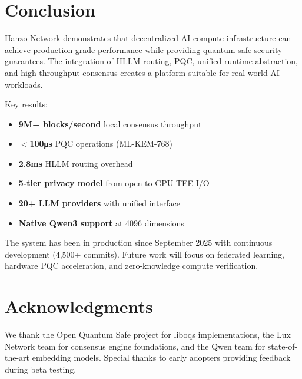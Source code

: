 \documentclass[11pt,twocolumn]{article}
\begin{document}
\section{Conclusion}

Hanzo Network demonstrates that decentralized AI compute infrastructure can achieve production-grade performance while providing quantum-safe security guarantees. The integration of HLLM routing, PQC, unified runtime abstraction, and high-throughput consensus creates a platform suitable for real-world AI workloads.

Key results:
\begin{itemize}
\item \textbf{9M+ blocks/second} local consensus throughput
\item \textbf{$<$100μs} PQC operations (ML-KEM-768)
\item \textbf{2.8ms} HLLM routing overhead
\item \textbf{5-tier privacy model} from open to GPU TEE-I/O
\item \textbf{20+ LLM providers} with unified interface
\item \textbf{Native Qwen3 support} at 4096 dimensions
\end{itemize}

The system has been in production since September 2025 with continuous development (4,500+ commits). Future work will focus on federated learning, hardware PQC acceleration, and zero-knowledge compute verification.

\section*{Acknowledgments}

We thank the Open Quantum Safe project for liboqs implementations, the Lux Network team for consensus engine foundations, and the Qwen team for state-of-the-art embedding models. Special thanks to early adopters providing feedback during beta testing.
\end{document}
